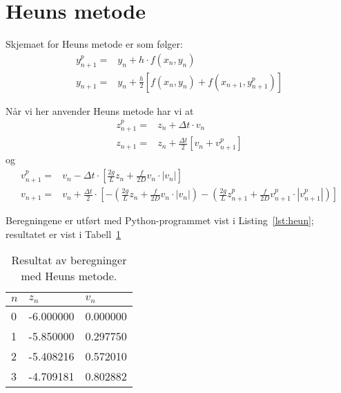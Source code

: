 \section{Heuns metode} %
\label{sec:heuns_metode}
Skjemaet for Heuns metode er som følger:
\begin{align}
  y_{n+1}^p = & y_n + h \cdot f(x_n,y_n) \\
  y_{n+1}   = & y_n + \frac{h}{2} \left[f(x_n,y_n)+f(x_{n+1},y_{n+1}^p)\right]
\end{align}

Når vi her anvender Heuns metode har vi at
\begin{align}
  z_{n+1}^p = & z_n + \Delta t \cdot v_n \\
  z_{n+1}   = & z_n + \frac{\Delta t}{2} \left[ v_n + v_{n+1}^p \right]
\end{align}
og
\begin{align}
  v_{n+1}^p = & v_n - \Delta t \cdot \left[ \frac{2g}{L}z_n + \frac{f}{2D}v_n            \cdot |v_n| \right] \\
  v_{n+1} = & v_n + \frac{\Delta t}{2} \cdot
    \left[  
      - \left( \frac{2g}{L}z_n + \frac{f}{2D}v_n \cdot |v_n| \right)
      - \left( \frac{2g}{L}z_{n+1}^p + \frac{f}{2D}v_{n+1}^p \cdot |v_{n+1}^p| \right)
    \right]
\end{align}

Beregningene er utført med Python-programmet vist i Listing~\ref{lst:heun}; resultatet er vist i Tabell~\ref{tab:heun}


\begin{table}[H]
  \centering
  \caption{Resultat av beregninger med Heuns metode.}
  \label{tab:heun}
  \begin{tabularx}{0.6\textwidth}{XXX}
    \toprule
    $n$  & $z_n$  & $v_n$ \\
    \midrule
    0 & -6.000000 & 0.000000 \\
    1 & -5.850000 & 0.297750 \\
    2 & -5.408216 & 0.572010 \\
    3 & -4.709181 & 0.802882 \\
    \bottomrule
  \end{tabularx}
\end{table}


